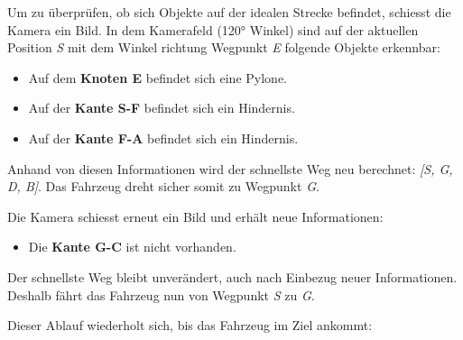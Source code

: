 \documentclass[../main.tex]{subfiles}
\begin{document}
Um zu überprüfen, ob sich Objekte auf der idealen Strecke befindet, schiesst die Kamera ein Bild. In dem Kamerafeld (120° Winkel) sind auf der aktuellen Position \textit{S} mit dem Winkel richtung Wegpunkt \textit{E} folgende Objekte erkennbar:
\begin{itemize}
    \item Auf dem \textbf{Knoten E} befindet sich eine Pylone.
    \item Auf der \textbf{Kante S-F} befindet sich ein Hindernis.
    \item Auf der \textbf{Kante F-A} befindet sich ein Hindernis.
\end{itemize}

Anhand von diesen Informationen wird der schnellste Weg neu berechnet: \textit{[S, G, D, B]}. Das Fahrzeug dreht sicher somit zu Wegpunkt \textit{G}. 


Die Kamera schiesst erneut ein Bild und erhält neue Informationen:
\begin{itemize}
    \item Die \textbf{Kante G-C} ist nicht vorhanden.
\end{itemize}

Der schnellste Weg bleibt unverändert, auch nach Einbezug neuer Informationen.
Deshalb fährt das Fahrzeug nun von Wegpunkt \textit{S} zu \textit{G}.


Dieser Ablauf wiederholt sich, bis das Fahrzeug im Ziel ankommt:
\end{document}
